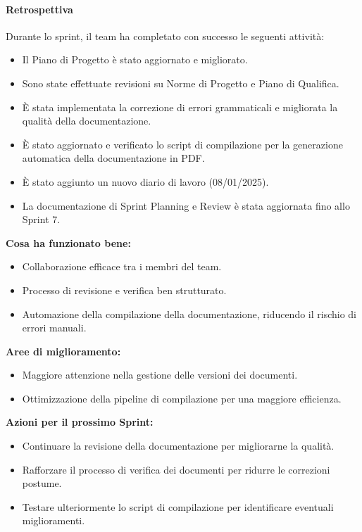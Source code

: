 \documentclass{article}
\begin{document}
                \paragraph{Retrospettiva}
                Durante lo sprint, il team ha completato con successo le seguenti attività:
                \begin{itemize}
                    \item Il Piano di Progetto è stato aggiornato e migliorato.
                    \item Sono state effettuate revisioni su Norme di Progetto e Piano di Qualifica.
                    \item È stata implementata la correzione di errori grammaticali e migliorata la qualità della documentazione.
                    \item È stato aggiornato e verificato lo script di compilazione per la generazione automatica della documentazione in PDF.
                    \item È stato aggiunto un nuovo diario di lavoro (08/01/2025).
                    \item La documentazione di Sprint Planning e Review è stata aggiornata fino allo Sprint 7.
                \end{itemize}
                
                \textbf{Cosa ha funzionato bene:}
                \begin{itemize}
                    \item Collaborazione efficace tra i membri del team.
                    \item Processo di revisione e verifica ben strutturato.
                    \item Automazione della compilazione della documentazione, riducendo il rischio di errori manuali.
                \end{itemize}
                
                \textbf{Aree di miglioramento:}
                \begin{itemize}
                    \item Maggiore attenzione nella gestione delle versioni dei documenti.
                    \item Ottimizzazione della pipeline di compilazione per una maggiore efficienza.
                \end{itemize}
                
                \textbf{Azioni per il prossimo Sprint:}
                \begin{itemize}
                    \item Continuare la revisione della documentazione per migliorarne la qualità.
                    \item Rafforzare il processo di verifica dei documenti per ridurre le correzioni postume.
                    \item Testare ulteriormente lo script di compilazione per identificare eventuali miglioramenti.
                \end{itemize}
\end{document}

